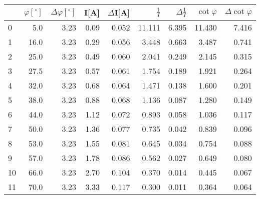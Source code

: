 \begin{tabular}{lrrrrrrrr}
\toprule
{} &  $\varphi[^\circ]$ &  $\Delta \varphi[^\circ]$ &  I[A] &  $\Delta$I[A] &  $\frac{1}{I}$ &  $\Delta \frac{1}{I}$ &  $\cot{\varphi}$ &  $\Delta \cot{\varphi}$ \\
\midrule
0  &                5.0 &                     3.23 &  0.09 &         0.052 &         11.111 &                 6.395 &           11.430 &                   7.416 \\
1  &               16.0 &                     3.23 &  0.29 &         0.056 &          3.448 &                 0.663 &            3.487 &                   0.741 \\
2  &               25.0 &                     3.23 &  0.49 &         0.060 &          2.041 &                 0.249 &            2.145 &                   0.315 \\
3  &               27.5 &                     3.23 &  0.57 &         0.061 &          1.754 &                 0.189 &            1.921 &                   0.264 \\
4  &               32.0 &                     3.23 &  0.68 &         0.064 &          1.471 &                 0.138 &            1.600 &                   0.201 \\
5  &               38.0 &                     3.23 &  0.88 &         0.068 &          1.136 &                 0.087 &            1.280 &                   0.149 \\
6  &               44.0 &                     3.23 &  1.12 &         0.072 &          0.893 &                 0.058 &            1.036 &                   0.117 \\
7  &               50.0 &                     3.23 &  1.36 &         0.077 &          0.735 &                 0.042 &            0.839 &                   0.096 \\
8  &               53.0 &                     3.23 &  1.55 &         0.081 &          0.645 &                 0.034 &            0.754 &                   0.088 \\
9  &               57.0 &                     3.23 &  1.78 &         0.086 &          0.562 &                 0.027 &            0.649 &                   0.080 \\
10 &               66.0 &                     3.23 &  2.70 &         0.104 &          0.370 &                 0.014 &            0.445 &                   0.067 \\
11 &               70.0 &                     3.23 &  3.33 &         0.117 &          0.300 &                 0.011 &            0.364 &                   0.064 \\
\bottomrule
\end{tabular}
